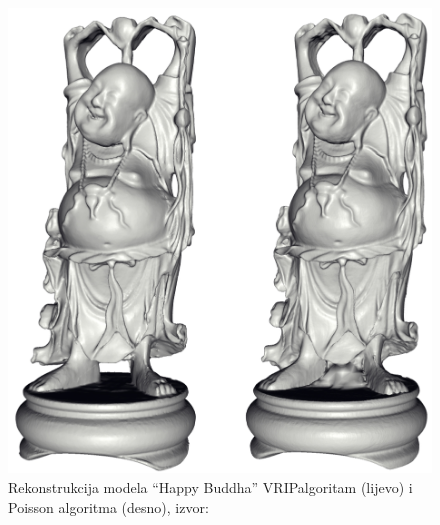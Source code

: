\begin{figure}[h]
\centering
\includegraphics[scale=0.20]{figures/poisson-buddha.png}
\caption[]{Rekonstrukcija modela ``Happy Buddha'' 
VRIP\footnotemark[2] algoritam (lijevo) i Poisson algoritma (desno),
izvor:~\cite{Kazhdan:2006}}
\label{fig:poisson-buddha.png}
\end{figure}



\newpage
